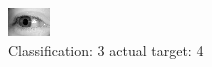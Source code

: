 \begin{figure}[h!]
\begin{center}
\includegraphics[width=0.60\columnwidth]{figures/ID3176_class_3_target_4.png}
\end{center}
\caption{ Classification: 3 actual target: 4}
\label{fig:ID3176_class_3_target_4}
\end{figure}
